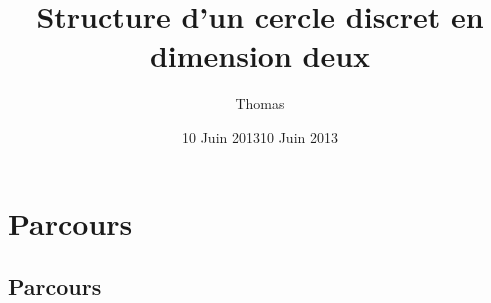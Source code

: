\documentclass{beamer}
\title[Présentation M2Disco]{Structure d'un cercle discret en dimension deux} %
\author{Thomas \bsc{Lafond}} %
\date{10 Juin 2013}
\institute[LIRIS] %
{
  Laboratoire d'InfoRmatique en Image et Syst\`{e}mes d'information \\ %
  \medskip
  \textit{-- Présentation d'équipe : M2Disco --}\\
  \medskip
  Encadrant : Tristan \bsc{Roussillon}
}
\date{10 Juin 2013} %
\begin{document}
\begin{frame}
  \titlepage %
\end{frame}


\section{Parcours}

\subsection{Parcours}
 
\end{document}
